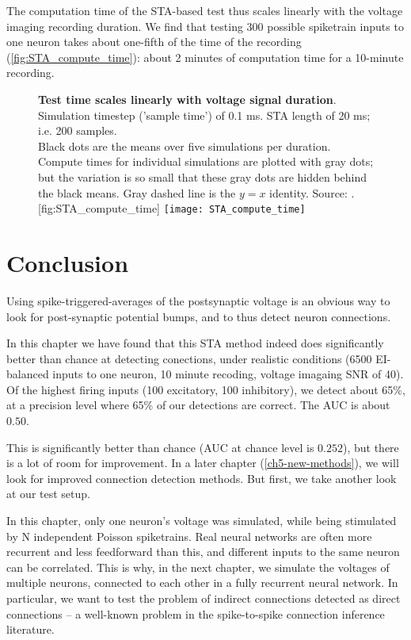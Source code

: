 The computation time of the STA-based test thus scales linearly with the voltage imaging recording duration. We find that testing 300 possible spiketrain inputs to one neuron takes about one-fifth of the time of the recording (\cref{fig:STA_compute_time}): about 2 minutes of computation time for a 10-minute recording.

\begin{figure}
    \begin{sidecaption}
        {\textbf{Test time scales linearly with voltage signal duration}.\\
        Simulation timestep ('sample time') of 0.1 ms. STA length of 20 ms; i.e. 200 samples.\\
        Black dots are the means over five simulations per duration. Compute times for individual simulations are plotted with gray dots; but the variation is so small that these gray dots are hidden behind the black means. Gray dashed line is the $y = x$ identity.  Source: .}
        [fig:STA_compute_time]
        \texttt{[image: STA\_compute\_time]}
    \end{sidecaption}
\end{figure}


\section{Conclusion}

Using spike-triggered-averages of the postsynaptic voltage is an obvious way to look for post-synaptic potential bumps, and to thus detect neuron connections.

In this chapter we have found that this STA method indeed does significantly better than chance at detecting conections, under realistic conditions (6500 EI-balanced inputs to one neuron, 10 minute recoding, voltage imagaing SNR of 40).
Of the highest firing inputs (100 excitatory, 100 inhibitory), we detect about 65\%, at a precision level where 65\% of our detections are correct. The AUC is about $0.50$.

This is significantly better than chance (AUC at chance level is $0.252$), but there is a lot of room for improvement. In a later chapter (\cref{ch5-new-methods}), we will look for improved connection detection methods. But first, we take another look at our test setup.

In this chapter, only one neuron's voltage was simulated, while being stimulated by N independent Poisson spiketrains. Real neural networks are often more recurrent and less feedforward than this, and different inputs to the same neuron can be correlated. This is why, in the next chapter, we simulate the voltages of multiple neurons, connected to each other in a fully recurrent neural network. In particular, we want to test the problem of indirect connections detected as direct connections -- a well-known problem in the spike-to-spike connection inference literature.\cite{Orlandi2017FirstConnectomicsChallenge,Das2020SystematicErrorsConnectivity}



